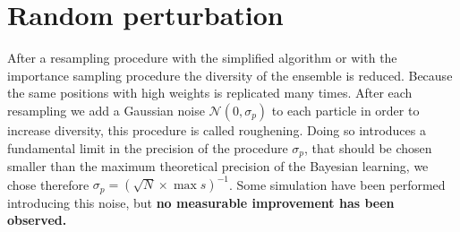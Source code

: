 \documentclass[aps, pra, 10pt, twocolumn, superscriptaddress,floatfix]{revtex4-1}
\begin{document}
\section{Random perturbation}
%
After a resampling procedure with the simplified algorithm or with the importance sampling procedure the diversity of the ensemble is reduced. Because the same positions with high weights is replicated many times. After each resampling we add a Gaussian noise $\mathcal{N} (0, \sigma_p)$ to each particle in order to increase diversity, this procedure is called roughening. Doing so introduces a fundamental limit in the precision of the procedure $\sigma_p$, that should be chosen smaller than the maximum theoretical precision of the Bayesian learning, we chose therefore $\sigma_p = (\sqrt{N} \times \max s)^{-1}$. Some simulation have been performed introducing this noise, but \textbf{no measurable improvement has been observed.}

\appendix
\end{document}
